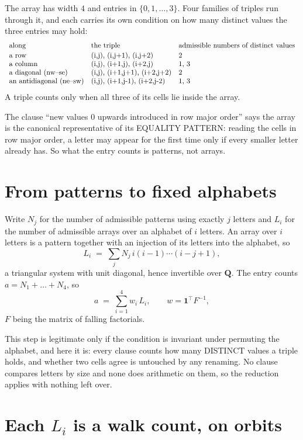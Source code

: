 \documentclass[11pt,a4paper]{article}
\theoremstyle{plain}
\theoremstyle{definition}
\begin{document}
The array has width $4$ and entries in $\{0,1,\dots,3\}$. Four families of triples
run through it, and each carries its own condition on how many distinct values the three
entries may hold:
\[
\begin{array}{lll}
\text{along} & \text{the triple} & \text{admissible numbers of distinct values} \\[2pt]
\text{a row} & $(i,j),\ (i,j+1),\ (i,j+2)$ & $2$ \\
\text{a column} & $(i,j),\ (i+1,j),\ (i+2,j)$ & $1, 3$ \\
\text{a diagonal (nw--se)} & $(i,j),\ (i+1,j+1),\ (i+2,j+2)$ & $2$ \\
\text{an antidiagonal (ne--sw)} & $(i,j),\ (i+1,j-1),\ (i+2,j-2)$ & $1, 3$ \\
\end{array}
\]
A triple counts only when all three of its cells lie inside the array.

The clause ``new values $0$ upwards introduced in row major order'' says the array is the
canonical representative of its EQUALITY PATTERN: reading the cells in row major order, a
letter may appear for the first time only if every smaller letter already has. So what the
entry counts is patterns, not arrays.

\section{From patterns to fixed alphabets}

Write $N_j$ for the number of admissible patterns using exactly $j$ letters and $L_i$ for the
number of admissible arrays over an alphabet of $i$ letters. An array over $i$ letters is a
pattern together with an injection of its letters into the alphabet, so
\[
L_i\;=\;\sum_j N_j\,i(i-1)\cdots(i-j+1),
\]
a triangular system with unit diagonal, hence invertible over $\mathbf{Q}$. The entry counts
$a=N_1+\dots+N_{4}$, so
\[
a\;=\;\sum_{i=1}^{4}w_i\,L_i ,\qquad w=\mathbf{1}^{\!\top}F^{-1},
\]
$F$ being the matrix of falling factorials.

This step is legitimate only if the condition is invariant under permuting the alphabet, and
here it is: every clause counts how many DISTINCT values a triple holds, and whether two cells
agree is untouched by any renaming. No clause compares letters by size and none does arithmetic
on them, so the reduction applies with nothing left over.

\section{Each $L_i$ is a walk count, on orbits}
\end{document}
